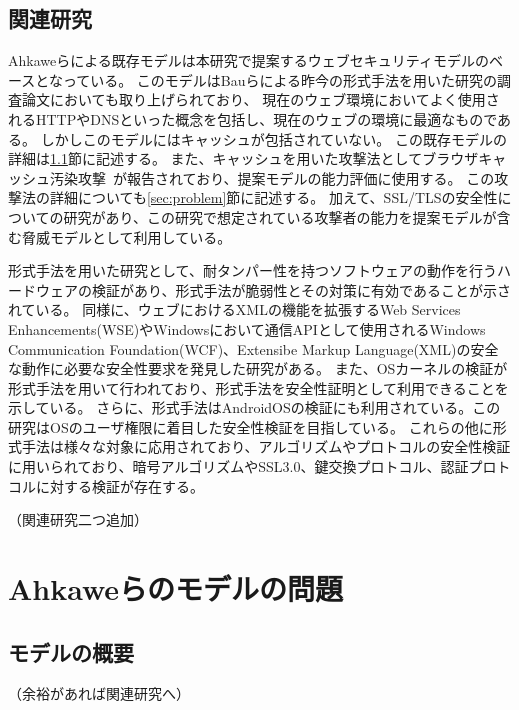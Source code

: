 \documentclass{css}
\begin{document}
\subsection{関連研究}
Ahkaweらによる既存モデル\cite{webmodel}は本研究で提案するウェブセキュリティモデルのベースとなっている。
このモデルはBauらによる昨今の形式手法を用いた研究の調査論文\cite{security_modeling_and_analysis}においても取り上げられており、
現在のウェブ環境においてよく使用されるHTTPやDNSといった概念を包括し、現在のウェブの環境に最適なものである。
しかしこのモデルにはキャッシュが包括されていない。
この既存モデルの詳細は\ref{sec:existingmodel}節に記述する。
また、キャッシュを用いた攻撃法としてブラウザキャッシュ汚染攻撃~\cite{bcpattack}が報告されており、提案モデルの能力評価に使用する。
この攻撃法の詳細についても\ref{sec:problem}節に記述する。
加えて、SSL/TLSの安全性についての研究\cite{securing_frame_communication_in_browsers}があり、この研究で想定されている攻撃者の能力を提案モデルが含む脅威モデルとして利用している。

形式手法を用いた研究として、耐タンパー性を持つソフトウェアの動作を行うハードウェアの検証\cite{specifying_and_verifying_hardware_for}があり、形式手法が脆弱性とその対策に有効であることが示されている。
\color{red}
同様に、ウェブにおけるXMLの機能を拡張するWeb Services Enhancements(WSE)やWindowsにおいて通信APIとして使用されるWindows Communication Foundation(WCF)、Extensibe Markup Language(XML)の安全な動作に必要な安全性要求を発見した研究\cite{TFFWS27,TFFWS28}がある。
\color{black}
また、OSカーネルの検証\cite{sel4_formal_verification_of_an}が形式手法を用いて行われており、形式手法を安全性証明として利用できることを示している。
さらに、形式手法はAndroidOSの検証\cite{towards_formal_analysis_of_the}にも利用されている。この研究はOSのユーザ権限に着目した安全性検証を目指している。
これらの他に形式手法は様々な対象に応用されており、アルゴリズムやプロトコルの安全性検証に用いられており、暗号アルゴリズムやSSL3.0、鍵交換プロトコル、認証プロトコルに対する検証が存在する\cite{TFFWS17,TFFWS18,TFFWS19,TFFWS20}。

\color{red}
（関連研究二つ追加）
\color{black}

\section{Ahkaweらのモデルの問題}

\subsection{モデルの概要}
\label{sec:existingmodel}
\color{red}
（余裕があれば関連研究へ）
\color{black}
\end{document}
